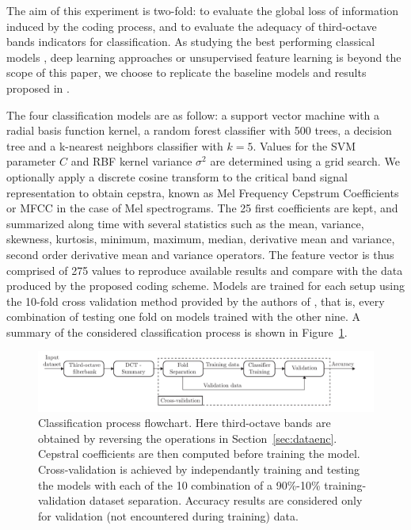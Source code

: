\documentclass[sensors,article,submit,moreauthors,pdftex,10pt,a4paper]{mdpi}
\begin{document}
The aim of this experiment is two-fold: to evaluate the global loss of information induced by the coding process, and to evaluate the adequacy of third-octave bands indicators for classification. As studying the best performing classical models \citep{ntalampiras2013}, deep learning approaches \citep{salamon2017} or unsupervised feature learning is beyond the scope of this paper, we choose to replicate the baseline models and results proposed in \cite{salamon2014}.

The four classification models are as follow: a support vector machine with a radial basis function kernel, a random forest classifier with 500 trees, a decision tree and a k-nearest neighbors classifier with $k = 5$. Values for the SVM parameter $C$ and RBF kernel variance $\sigma^2$ are determined using a grid search. We optionally apply a discrete cosine transform to the critical band signal representation to obtain cepstra, known as Mel Frequency Cepstrum Coefficients or MFCC in the case of Mel spectrograms. The 25 first coefficients are kept, and summarized along time with several statistics such as the mean, variance, skewness, kurtosis, minimum, maximum, median, derivative mean and variance, second order derivative mean and variance operators. The feature vector is thus comprised of 275 values to reproduce available results and compare with the data produced by the proposed coding scheme. Models are trained for each setup using the 10-fold cross validation method provided by the authors of \cite{salamon2014}, that is, every combination of testing one fold on models trained with the other nine. A summary of the considered classification process is shown in Figure~\ref{fig:class_flwc}.

\begin{figure}[htbp]
	\centering
		\includegraphics[width=.9\textwidth]{figures/class.pdf}
	\caption{Classification process flowchart. Here third-octave bands are obtained by reversing the operations in Section~\ref{sec:dataenc}. Cepstral coefficients are then computed before training the model. Cross-validation is achieved by independantly training and testing the models with each of the 10 combination of a 90\%-10\% training-validation dataset separation. Accuracy results are considered only for validation (not encountered during training) data.}
	\label{fig:class_flwc}
\end{figure}
\end{document}
